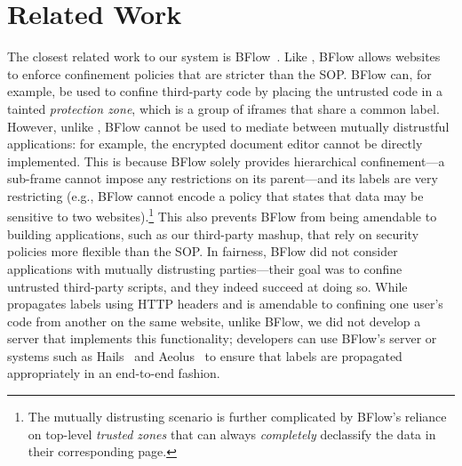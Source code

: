 \section{Related Work}
\label{sec:related}

The closest related work to our system is BFlow~\cite{Yip:2009:PBS}.
%
Like \sys{}, BFlow allows websites to enforce confinement policies
that are stricter than the SOP\@.
%
BFlow can, for example, be used to confine third-party code by placing
the untrusted code in a tainted \emph{protection zone}, which is a group
of iframes that share a common label.
%
However, unlike \sys{}, BFlow cannot be used to mediate between mutually
distrustful applications: for example, the encrypted document editor
cannot be directly implemented.
%
This is because BFlow solely provides hierarchical confinement---a
sub-frame cannot impose any restrictions on its parent---and its
labels are very restricting (e.g., BFlow cannot encode a policy that
states that data may be sensitive to two websites).\footnote{
The mutually distrusting scenario is further complicated by BFlow's
reliance on top-level \emph{trusted zones} that can always
\emph{completely} declassify the data in their corresponding page.}
%
This also prevents BFlow from being amendable to building
applications, such as our third-party mashup, that rely on security policies
more flexible than the SOP\@.
%
In fairness, BFlow did not consider applications with mutually
distrusting parties---their goal was to confine untrusted third-party
scripts, and they indeed succeed at doing so.
%
While \sys{} propagates labels using HTTP headers and is
amendable to confining one user's code from another on the same
website, unlike BFlow, we did not develop a server that implements this
functionality; developers can use BFlow's server or systems such as
Hails~\cite{giffin:2012:hails} and Aeolus~\cite{cheng:aeolus} to
ensure that labels are propagated appropriately in an end-to-end
fashion.
%



